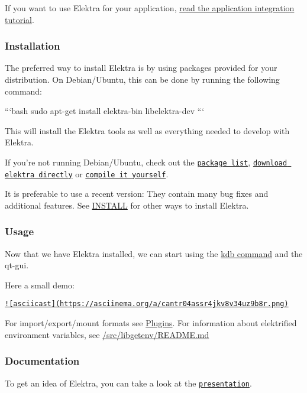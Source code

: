 If you want to use Elektra for your application, \hyperlink{doc_tutorials_application-integration_md}{read the application integration tutorial}.

\subsubsection*{Installation}

The preferred way to install Elektra is by using packages provided for your distribution. On Debian/\+Ubuntu, this can be done by running the following command\+:

```bash sudo apt-\/get install elektra-\/bin libelektra-\/dev ```

This will install the Elektra tools as well as everything needed to develop with Elektra.

If you're not running Debian/\+Ubuntu, check out the \href{#packages}{\tt package list}, \href{#download}{\tt download elektra directly} or \href{#compiling}{\tt compile it yourself}.

It is preferable to use a recent version\+: They contain many bug fixes and additional features. See \hyperlink{doc_INSTALL_md}{I\+N\+S\+T\+A\+L\+L} for other ways to install Elektra.

\subsubsection*{Usage}

Now that we have Elektra installed, we can start using the \hyperlink{md_doc_help_kdb_doc_help_kdb_md}{kdb command} and the qt-\/gui.

Here a small demo\+:

\href{https://asciinema.org/a/cantr04assr4jkv8v34uz9b8r}{\tt !\mbox{[}asciicast\mbox{]}(https\+://asciinema.\+org/a/cantr04assr4jkv8v34uz9b8r.\+png)}

For import/export/mount formats see \hyperlink{md_src_plugins_README_src_plugins_README_md}{Plugins}. For information about elektrified environment variables, see \hyperlink{src_libs_getenv_README_md}{/src/libgetenv/\+R\+E\+A\+D\+M\+E.md}

\subsubsection*{Documentation}

To get an idea of Elektra, you can take a look at the \href{http://www.libelektra.org/ftp/elektra/presentations/2016/FOSDEM/fosdem.odp}{\tt presentation}.

